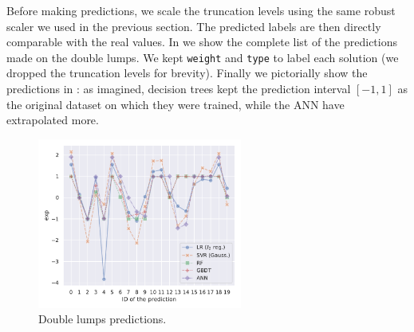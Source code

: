 Before making predictions, we scale the truncation levels using the same robust scaler we used in the previous section.
The predicted labels are then directly comparable with the real values.
In  we show the complete list of the predictions made on the double lumps.\footnotemark{}
We kept \texttt{weight} and \texttt{type} to label each solution (we dropped the truncation levels for brevity).
Finally we pictorially show the predictions in : as imagined, decision trees kept the prediction interval $[-1, 1]$ as the original dataset on which they were trained, while the ANN have extrapolated more.

\begin{figure}[htbp]
  \centering
  \includegraphics[width=0.6\textwidth]{img/dlumps_pred}
  \caption{Double lumps predictions.}
  \label{fig:lumps:dlump_preds}
\end{figure}

